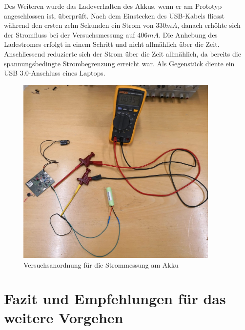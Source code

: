 Des Weiteren wurde das Ladeverhalten des Akkus, wenn er am Prototyp angeschlossen ist, überprüft. Nach dem Einstecken des USB-Kabels fliesst während den ersten zehn Sekunden ein Strom von $330mA$, danach erhöhte sich der Stromfluss bei der Versuchsmessung auf $406mA$. Die Anhebung des Ladestromes erfolgt in einem Schritt und nicht allmählich über die Zeit. Anschliessend reduzierte sich der Strom über die Zeit allmählich, da bereits die spannungsbedingte Strombegrenzung erreicht war. Als Gegenstück diente ein USB 3.0-Anschluss eines Laptops.\\


\begin{figure}[htp]
	\centering
	\includegraphics[width=10cm]{Bilder/StrommessungAkku.JPG}
	 \caption{Versuchsanordnung für die Strommessung am Akku}
	 \label{fig:StrommessungAkku}
\end{figure}



\section{Fazit und Empfehlungen für das weitere Vorgehen}

